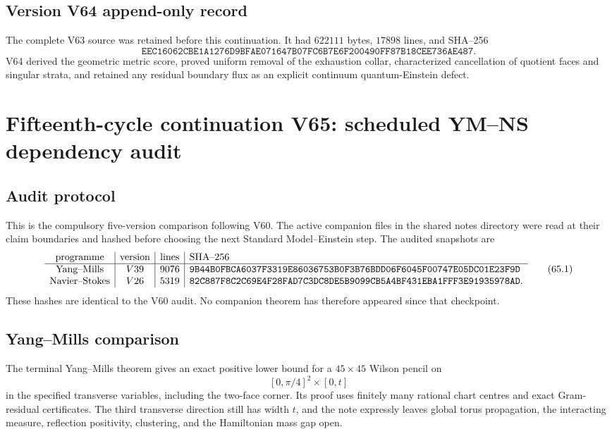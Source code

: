 \documentclass[11pt]{article}
\theoremstyle{remark}
\begin{document}
\section*{Version V64 append-only record}
The complete V63 source was retained before this continuation.  It
had \(622111\) bytes, \(17898\) lines, and SHA--256
\[
 \texttt{EEC16062CBE1A1276D9BFAE071647B07FC6B7E6F200490FF87B18CEE736AE487}.
\]
V64 derived the geometric metric score, proved uniform removal of
the exhaustion collar, characterized cancellation of quotient
faces and singular strata, and retained any residual boundary flux
as an explicit continuum quantum-Einstein defect.

\chapter{Fifteenth-cycle continuation V65: scheduled YM--NS dependency audit}
\label{sec:v15v65}

\section{Audit protocol}

This is the compulsory five-version comparison following V60.
The active companion files in the shared notes directory were read
at their claim boundaries and hashed before choosing the next
Standard Model--Einstein step.  The audited snapshots are
\[
\begin{array}{c|c|c|l}
\hbox{programme}&\hbox{version}&\hbox{lines}&\hbox{SHA--256}\\ \hline
\hbox{Yang--Mills}&V39&9076&
\texttt{9B44B0FBCA6037F3319E86036753B0F3B76BDD06F6045F00747E05DC01E23F9D}\\
\hbox{Navier--Stokes}&V26&5319&
\texttt{82C887F8C2C69E4F28FAD7C3DC8DE5B9099CB5A4BF431EBA1FFF3E91935978AD}.
\end{array}                                             \tag{65.1}
\]
These hashes are identical to the V60 audit.  No companion theorem
has therefore appeared since that checkpoint.

\section{Yang--Mills comparison}

The terminal Yang--Mills theorem gives an exact positive lower
bound for a \(45\times45\) Wilson pencil on
\[
 [0,\pi/4]^2\times[0,t]                               \tag{65.2}
\]
in the specified transverse variables, including the two-face
corner.  Its proof uses finitely many rational chart centres and
exact Gram-residual certificates.  The third transverse direction
still has width \(t\), and the note expressly leaves global torus
propagation, the interacting measure, reflection positivity,
clustering, and the Hamiltonian mass gap open.
\end{document}
